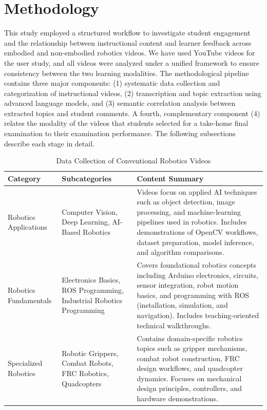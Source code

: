 \documentclass[fleqn,10pt]{JLA_article} %
\begin{document}

\section{Methodology}
\label{sec:method}

This study employed a structured workflow to investigate student engagement and the relationship between instructional content and learner feedback across embodied and non-embodied robotics videos. We have used YouTube videos for the user study, and all videos were analyzed under a unified framework to ensure consistency between the two learning modalities. The methodological pipeline contains three major components: (1) systematic data collection and categorization of instructional videos, (2) transcription and topic extraction using advanced language models, and (3) semantic correlation analysis between extracted topics and student comments. A fourth, complementary component (4) relates the modality of the videos that students selected for a take-home final examination to their examination performance. The following subsections describe each stage in detail.

\begin{table}[ht]
    \centering
    \caption{Data Collection of Conventional Robotics Videos}
    \begin{tabular}{p{3cm} p{3cm} p{7cm}}
        \toprule
        \textbf{Category} & \textbf{Subcategories} & \textbf{Content Summary} \\
        \midrule

        Robotics Applications
        & Computer Vision, Deep Learning, AI-Based Robotics
        & Videos focus on applied AI techniques such as object detection, image processing, and machine-learning pipelines used in robotics. Includes demonstrations of OpenCV workflows, dataset preparation, model inference, and algorithm comparisons. \\[6pt]

        Robotics Fundamentals
        & Electronics Basics, ROS Programming, Industrial Robotics Programming
        & Covers foundational robotics concepts including Arduino electronics, circuits, sensor integration, robot motion basics, and programming with ROS (installation, simulation, and navigation). Includes teaching-oriented technical walkthroughs. \\[6pt]

        Specialized Robotics
        & Robotic Grippers, Combat Robots, FRC Robotics, Quadcopters
        & Contains domain-specific robotics topics such as gripper mechanisms, combat robot construction, FRC design workflows, and quadcopter dynamics. Focuses on mechanical design principles, controllers, and hardware demonstrations. \\

        \bottomrule
    \end{tabular}
    \label{tab:categorized_videos}
\end{table}
\end{document}
